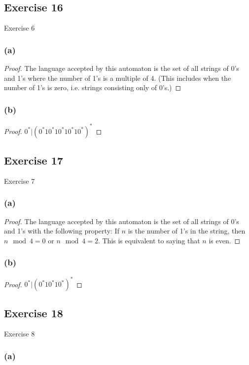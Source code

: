 \documentclass[14pt]{extarticle}
\begin{document}
\subsection{Exercise 16}
Exercise 6
\subsubsection{(a)}
\begin{proof}
    The language accepted by this automaton is the set of all strings of 0’s and 1’s where the number of 1's is a multiple
    of 4. (This includes when the number of 1's is zero, i.e. strings consisting only of 0's.)
\end{proof}

\subsubsection{(b)}
\begin{proof}
    \(0^* | (0^*10^*10^*10^*10^*)^*\)
\end{proof}

\subsection{Exercise 17}
Exercise 7
\subsubsection{(a)}
\begin{proof}
    The language accepted by this automaton is the set of all strings of 0’s and 1’s with the following property: If \(n\)
    is the number of 1’s in the string, then \(n \mod 4 = 0\) or \(n \mod 4 = 2\).
    This is equivalent to saying that \(n\) is even.
\end{proof}

\subsubsection{(b)}
\begin{proof}
    \(0^* | (0^*10^*10^*)^*\)
\end{proof}

\subsection{Exercise 18}
Exercise 8
\subsubsection{(a)}
\end{document}
